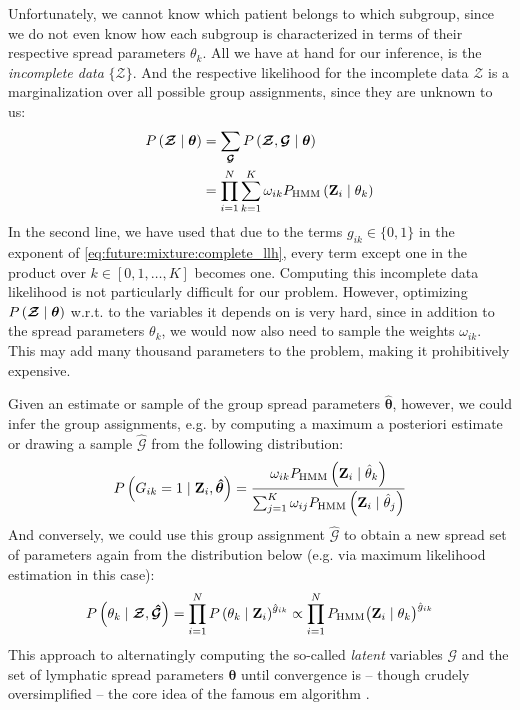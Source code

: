 \documentclass[\relativeRoot/main.tex]{subfiles}
\begin{document}
Unfortunately, we cannot know which patient belongs to which subgroup, since we do not even know how each subgroup is characterized in terms of their respective spread parameters $\theta_k$. All we have at hand for our inference, is the \emph{incomplete data} $\{ \boldsymbol{\mathcal{Z}} \}$. And the respective likelihood for the incomplete data $\boldsymbol{\mathcal{Z}}$ is a marginalization over all possible group assignments, since they are unknown to us:
%
\begin{equation}
    \begin{aligned}
        P \left( \boldsymbol{\mathcal{Z}} \mid \boldsymbol{\theta} \right) &= \sum_{\boldsymbol{\mathcal{G}}}{ P \left( \boldsymbol{\mathcal{Z}}, \boldsymbol{\mathcal{G}} \mid \boldsymbol{\theta} \right) } \\
        &= \prod_{i=1}^N{ \sum_{k=1}^K{ \omega_{ik} P_\text{HMM} \left( \mathbf{Z}_i \mid \theta_k \right) } }
    \end{aligned}
\end{equation}
%
In the second line, we have used that due to the terms $g_{ik} \in \{ 0,1 \}$ in the exponent of \cref{eq:future:mixture:complete_llh}, every term except one in the product over $k \in [0,1, \ldots, K]$ becomes one. Computing this incomplete data likelihood is not particularly difficult for our problem. However, optimizing $P \left( \boldsymbol{\mathcal{Z}} \mid \boldsymbol{\theta} \right)$ w.r.t. to the variables it depends on is very hard, since in addition to the spread parameters $\theta_k$, we would now also need to sample the weights $\omega_{ik}$. This may add many thousand parameters to the problem, making it prohibitively expensive.

Given an estimate or sample of the group spread parameters $\boldsymbol{\hat{\theta}}$, however, we could infer the group assignments, e.g. by computing a maximum a posteriori estimate or drawing a sample $\boldsymbol{\hat{\mathcal{G}}}$ from the following distribution:
%
\begin{equation}
    P \left( G_{ik} = 1 \mid \mathbf{Z}_i, \boldsymbol{\hat{\theta}} \right) = \frac{\omega_{ik} P_\text{HMM} \left( \mathbf{Z}_i \mid \hat{\theta}_k \right)}{\sum_{j=1}^K{ \omega_{ij} P_\text{HMM} \left( \mathbf{Z}_i \mid \hat{\theta}_j \right) } }
\end{equation}
%
And conversely, we could use this group assignment $\boldsymbol{\hat{\mathcal{G}}}$ to obtain a new spread set of parameters again from the distribution below (e.g. via maximum likelihood estimation in this case):
%
\begin{equation}
    P \left( \theta_k \mid \boldsymbol{\mathcal{Z}}, \boldsymbol{\hat{\mathcal{G}}} \right) = \prod_{i=1}^N P \left( \theta_k \mid \mathbf{Z}_i \right)^{\hat{g}_{ik}} \propto \prod_{i=1}^N{ P_\text{HMM} \big( \mathbf{Z}_i \mid \theta_k \big)^{\hat{g}_{ik}} }
\end{equation}
%
This approach to alternatingly computing the so-called \emph{latent} variables $\boldsymbol{\mathcal{G}}$ and the set of lymphatic spread parameters $\boldsymbol{\theta}$ until convergence is -- though crudely oversimplified -- the core idea of the famous \gls{em} algorithm \cite{dempster_maximum_1977}.
\end{document}
